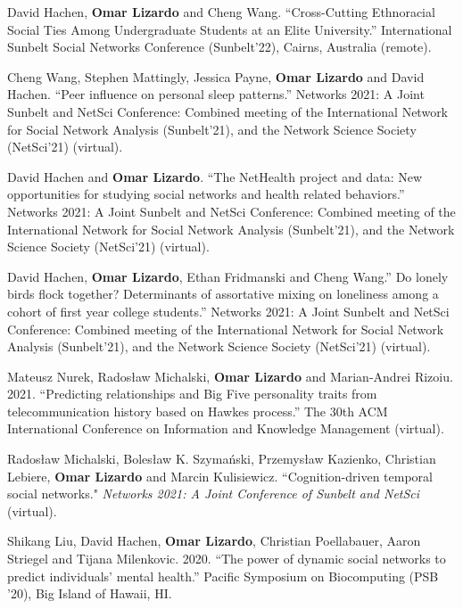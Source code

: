 \ind David Hachen, {\bf Omar Lizardo} and Cheng Wang.	``Cross-Cutting Ethnoracial Social Ties Among Undergraduate Students at an Elite University.'' International Sunbelt Social Networks Conference (Sunbelt'22), Cairns, Australia (remote).

\ind Cheng Wang, Stephen Mattingly, Jessica Payne, {\bf Omar Lizardo} and David Hachen. ``Peer influence on personal sleep patterns.''	Networks 2021: A Joint Sunbelt and NetSci Conference: Combined meeting of the International Network for Social Network Analysis (Sunbelt'21), and the Network Science Society (NetSci'21) (virtual).

\ind David Hachen and {\bf Omar Lizardo}. ``The NetHealth project and data: New opportunities for studying social networks and health related behaviors.'' Networks 2021: A Joint Sunbelt and NetSci Conference: Combined meeting of the International Network for Social Network Analysis (Sunbelt'21), and the Network Science Society (NetSci'21) (virtual).

\ind David Hachen, {\bf Omar Lizardo}, Ethan Fridmanski and Cheng Wang.'' Do lonely birds flock together? Determinants of assortative mixing on loneliness among a cohort of first year college students.'' Networks 2021: A Joint Sunbelt and NetSci Conference: Combined meeting of the International Network for Social Network Analysis (Sunbelt'21), and the Network Science Society (NetSci'21) (virtual).

\ind Mateusz Nurek, Rados\l{}aw Michalski, {\bf Omar Lizardo} and Marian-Andrei Rizoiu. 2021. ``Predicting relationships and Big Five personality traits from telecommunication history based on Hawkes process.'' The 30th ACM International Conference on Information and Knowledge Management (virtual).

\ind Rados\l{}aw Michalski, Boles\l{}aw K. Szyma\'{n}ski, Przemys\l{}aw Kazienko, Christian Lebiere, {\bf Omar Lizardo} and Marcin Kulisiewicz. ``Cognition-driven temporal social networks." {\em Networks 2021: A Joint Conference of Sunbelt and NetSci} (virtual).

\ind Shikang Liu, David Hachen, {\bf Omar Lizardo}, Christian Poellabauer, Aaron Striegel and Tijana Milenkovic. 2020. ``The power of dynamic social networks to predict individuals' mental health.'' Pacific Symposium on Biocomputing (PSB '20), Big Island of Hawaii, HI. 
  

